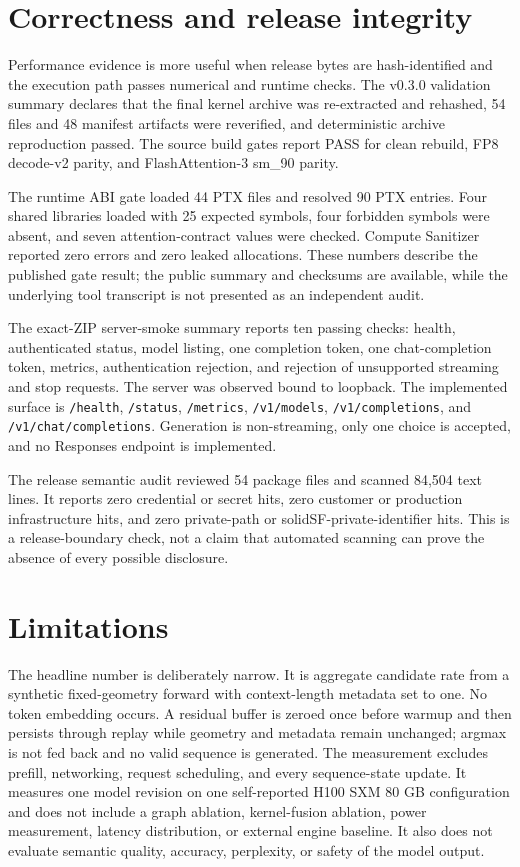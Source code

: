 \section{Correctness and release integrity}

Performance evidence is more useful when release bytes are hash-identified and
the execution path passes numerical and runtime checks. The v0.3.0 validation
summary declares that the final kernel archive was re-extracted and rehashed,
54 files and 48 manifest artifacts were reverified, and deterministic archive
reproduction passed. The source build gates report PASS for clean rebuild, FP8
decode-v2 parity, and FlashAttention-3 sm\_90 parity.

The runtime ABI gate loaded 44 PTX files and resolved 90 PTX entries. Four
shared libraries loaded with 25 expected symbols, four forbidden symbols were
absent, and seven attention-contract values were checked. Compute Sanitizer
reported zero errors and zero leaked allocations. These numbers describe the
published gate result; the public summary and checksums are available, while
the underlying tool transcript is not presented as an independent audit.

The exact-ZIP server-smoke summary reports ten passing checks: health, authenticated status,
model listing, one completion token, one chat-completion token, metrics,
authentication rejection, and rejection of unsupported streaming and stop
requests. The server was observed bound to loopback. The implemented surface
is \texttt{/health}, \texttt{/status}, \texttt{/metrics},
\texttt{/v1/models}, \texttt{/v1/completions}, and
\texttt{/v1/chat/completions}. Generation is non-streaming, only one choice is
accepted, and no Responses endpoint is implemented.

The release semantic audit reviewed 54 package files and scanned 84,504 text
lines. It reports zero credential or secret hits, zero customer or production
infrastructure hits, and zero private-path or solidSF-private-identifier hits. This
is a release-boundary check, not a claim that automated scanning can prove the
absence of every possible disclosure.

\section{Limitations}

The headline number is deliberately narrow. It is aggregate candidate rate from
a synthetic fixed-geometry forward with context-length metadata set to one. No
token embedding occurs. A residual buffer is zeroed once before warmup and then
persists through replay while geometry and metadata remain unchanged; argmax is
not fed back and no valid sequence is generated. The measurement excludes prefill,
networking, request scheduling, and every sequence-state update. It measures one
model revision on one self-reported H100 SXM 80 GB configuration and does not
include a graph ablation, kernel-fusion ablation, power measurement, latency
distribution, or external engine baseline. It also does not evaluate semantic
quality, accuracy, perplexity, or safety of the model output.

